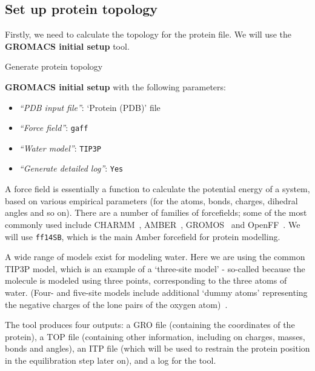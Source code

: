 \documentclass[twocolumn]{bmcart}%
\providecommand{\tightlist}{%
  \setlength{\itemsep}{0pt}\setlength{\parskip}{0pt}}
\begin{document}
\hypertarget{set-up-protein-topology}{%
\subsection*{Set up protein topology}\label{set-up-protein-topology}}

Firstly, we need to calculate the topology for the protein file. We will
use the \textbf{GROMACS initial setup} tool.

\begin{handson_box_colour}{Generate protein topology}

  \textbf{GROMACS initial setup} with the following parameters:

  \begin{itemize}
  \tightlist
  \item
    \emph{``PDB input file''}: `Protein (PDB)' file
  \item
    \emph{``Force field''}: \texttt{gaff}
  \item
    \emph{``Water model''}: \texttt{TIP3P}
  \item
    \emph{``Generate detailed log''}: \texttt{Yes}
  \end{itemize}
\end{handson_box_colour}

A force field is essentially a function to calculate the potential energy of a system, based on various empirical parameters (for the atoms, bonds, charges, dihedral angles and so on). There are a number of families of forcefields; some of the most commonly used include CHARMM~\cite{Vanommeslaeghe2009}, AMBER~\cite{Maier2015}, GROMOS~\cite{reif2012} and OpenFF~\cite{Mobley2018}. We will use \texttt{ff14SB}, which is the main Amber forcefield for protein modelling.

A wide range of models exist for modeling water. Here we are using the common TIP3P model, which is an example of a `three-site model' - so-called because the molecule is modeled using three points, corresponding to the three atoms of water. (Four- and five-site models include additional `dummy atoms' representing the negative charges of the lone pairs of the oxygen atom)~\cite{Onufriev2017}.

The tool produces four outputs: a GRO file (containing the coordinates
of the protein), a TOP file (containing other information, including on
charges, masses, bonds and angles), an ITP file (which will be used to
restrain the protein position in the equilibration step later on), and a
log for the tool.
\end{document}
